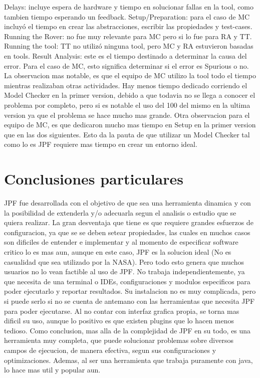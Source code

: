 \documentclass[runningheads]{llncs}
\begin{document}
Delays: incluye espera de hardware y tiempo en solucionar fallas en la tool, como tambien tiempo esperando un feedback.
Setup/Preparation: para el caso de MC incluyó el tiempo en crear las abstracciones, escribir las propiedades y test-cases.
Running the Rover: no fue muy relevante para MC pero si lo fue para RA y TT.
Running the tool: TT no utilizó ninguna tool, pero MC y RA estuvieron basadas en tools.
Result Analysis: este es el tiempo destinado a determinar la causa del error. Para el caso de MC, esto significa determinar si el error es Spurious o no.
La observacion mas notable, es que el equipo de MC utilizo la tool todo el tiempo mientras realizaban otras actividades. Hay menos tiempo dedicado corriendo el Model Checker en la primer version, debido a que todavia no se llega a conocer el problema por completo, pero si es notable el uso del 100 del mismo en la ultima version ya que el problema se hace mucho mas grande. Otra observacion para el equipo de MC, es que dedicaron mucho mas tiempo en Setup en la primer version que en las dos siguientes. Esto da la pauta de que utilizar un Model Checker tal como lo es JPF requiere mas tiempo en crear un entorno ideal.


\section{Conclusiones particulares}

JPF fue desarrollada con el objetivo de que sea una herramienta dinamica y con la posibilidad de extenderla y/o adecuarla segun el analisis o estudio que se quiera realizar. La gran desventaja que tiene es que requiere grandes esfuerzos de configuracion, ya que se se deben setear propiedades, las cuales en muchos casos son dificiles de entender e implementar y al momento de especificar software critico lo es mas aun, aunque en este caso, JPF es la solucion ideal (No es casualidad que sea utilizado por la NASA). Pero todo esto genera que muchos usuarios no lo vean factible al uso de JPF.
No trabaja independientemente, ya que necesita de una terminal o IDEs, configuraciones y modulos especificos para poder ejecutarlo y reportar resultados. Su instalacion no es muy complicada, pero si puede serlo si no se cuenta de antemano con las herramientas que necesita JPF para poder ejecutarse. Al no contar con interfaz grafica propia, se torna mas dificil su uso, aunque lo positivo es que existen plugins que lo hacen menos tedioso.
Como conclusion, mas alla de la complejidad de JPF en su todo, es una herramienta muy completa, que puede solucionar problemas sobre diversos campos de ejecucion, de manera efectiva, segun sus configuraciones y optimizaciones. Ademas, al ser una herramienta que trabaja puramente con java, lo hace mas util y popular aun.
\end{document}
